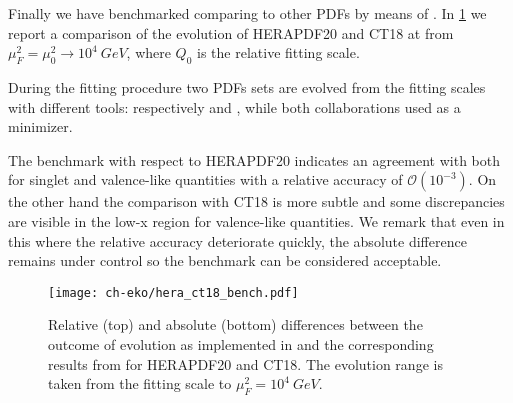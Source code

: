Finally we have benchmarked \eko{} comparing to other PDFs by means of \lhapdf{}.
In \cref{fig:Hera_ct18_bench} we report a comparison of the evolution of
HERAPDF20 and CT18 at \nnlo{} from $\mu_{F}^2=\mu_{0}^2 \rightarrow 10^4~GeV$, where
$Q_{0}$ is the relative fitting scale.

During the fitting procedure two PDFs sets are evolved from the fitting scales
with different tools: respectively \hoppet{} and \qcdnum{}, while both collaborations used
\xfitter{} as a minimizer.

The benchmark with respect to HERAPDF20 indicates an agreement with \eko{}
both for singlet and valence-like quantities with a relative accuracy of $\mathcal{O}(10^{-3})$.
On the other hand the comparison with CT18 is more subtle and some discrepancies are visible
in the low-x region for valence-like quantities. We remark that even in this where the relative accuracy
deteriorate quickly, the absolute difference remains under control so the benchmark can be considered
acceptable.


\begin{figure}
      \texttt{[image: ch-eko/hera\_ct18\_bench.pdf]}
      \caption{Relative (top)  and absolute (bottom) differences between
          the outcome of \nnlo{} \qcd{} evolution
          as implemented in \eko{} and the
          corresponding results from \lhapdf{} for HERAPDF20 and CT18.
          The evolution range is taken from the fitting scale to $\mu_{F}^2=10^4~GeV$.
          \label{fig:Hera_ct18_bench} }
  \end{figure}
